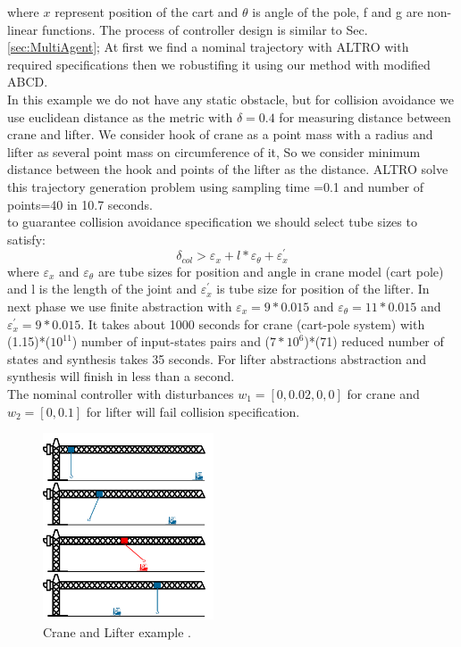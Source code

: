 where $x$ represent position of the cart  and $\theta$ is angle of the pole, f and g are non-linear functions. The process of controller design is similar to Sec. \ref{sec:MultiAgent}; At first we find a nominal trajectory with ALTRO with required specifications then we robustifing it using our method with modified ABCD.\\
In this example we do not have any static obstacle, but for collision avoidance we use euclidean distance as the metric with $\delta=0.4$ for measuring distance between crane and lifter. We consider hook of crane as a point mass with a radius and lifter as several point mass on circumference of it, So we consider minimum distance between the hook and points of the lifter as the distance. ALTRO solve this trajectory generation problem using sampling time =0.1 and number of points=40 in 10.7 seconds.\\
to guarantee collision avoidance specification we should select tube sizes to satisfy:
\[ \delta_{col}> \varepsilon_x + l*\varepsilon_\theta + \varepsilon^\prime_x\]
where $\varepsilon_x$ and $\varepsilon_\theta$ are tube sizes for position and angle in crane model (cart pole) and l is the length of the joint and $\varepsilon^\prime_x$ is tube size for position of the lifter.
In next phase we use finite abstraction with $\varepsilon_x=9*0.015$ and $\varepsilon_\theta=11*0.015$ and $\varepsilon^\prime_x=9*0.015$. It takes about 1000 seconds for crane (cart-pole system) with (1.15)*($10^{11}$) number of input-states pairs and ($7*10^6$)*(71) reduced number of states and synthesis takes 35 seconds. For lifter abstractions abstraction and synthesis will finish in less than a second.\\
The nominal controller with disturbances $w_1=[0,0.02,0,0]$ for crane and $w_2=[0,0.1]$ for lifter will fail collision specification.


\begin{figure}[t]\label{fig:cr_and_lft}
	\centering
	\includegraphics[width=0.45\textwidth]{figures/crane_and_lifter.png}
	\caption{Crane and Lifter example .}
\end{figure}

